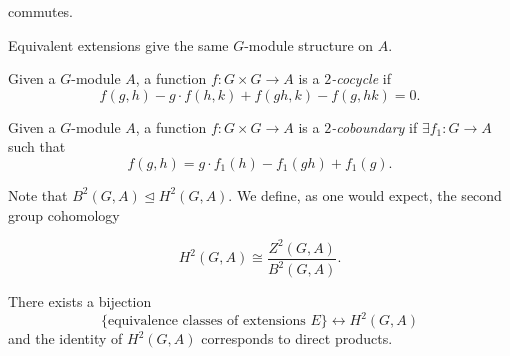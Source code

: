 \documentclass{article}
\begin{document}
commutes.

\begin{prop}
 Equivalent extensions give the same $G$-module structure on $A$. 
\end{prop}

\begin{defn}
 Given a $G$-module $A$, a function $f:G\times G\to A$ is a \textit{$2$-cocycle}
 if
 $$f(g,h) - g\cdot f(h,k) + f(gh,k) - f(g,hk) = 0.$$ 
\end{defn}

\begin{defn}
 Given a $G$-module $A$, a function $f:G\times G\to A$ is a \textit{$2$-coboundary}
 if $\exists f_1:G\to A$ such that
 $$f(g,h) = g\cdot f_1(h) - f_1(gh) + f_1(g).$$ 
\end{defn}

Note that $B^2(G,A)\trianglelefteq H^2(G,A)$. We define, as one would expect,
the second group cohomology

$$H^2(G,A) \cong \frac{Z^2(G,A)}{B^2(G,A)}.$$


\begin{thm}
  There exists a bijection
  $$\{\text{equivalence classes of extensions } E\}\longleftrightarrow H^2(G,A)$$
  and the identity of $H^2(G,A)$ corresponds to direct products.
\end{thm}
\end{document}
